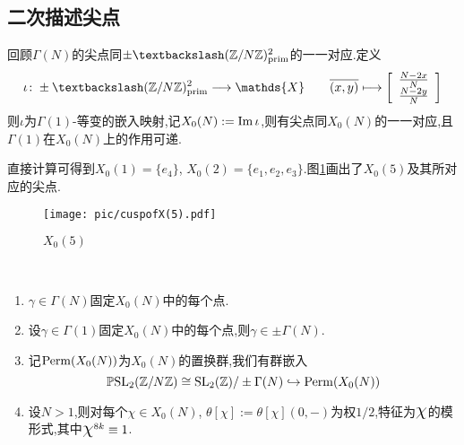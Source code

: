 \subsection{二次描述尖点}
\begin{theorem}
	回顾$\Gamma(N)$的尖点同$\pm\textbackslash(\mathbb{Z}/N\mathbb{Z})^2_{\prim}$的一一对应.定义
	$$\iota\colon \pm\textbackslash(\mathbb{Z}/N\mathbb{Z})^2_{\prim} \longrightarrow \mathds{X} \qquad \overline{(x,y)} \longmapsto \character{\frac{N-2x}{N}}{\frac{N-2y}{N}}$$
	则$\iota$为$\Gamma(1)$-等变的嵌入映射,记$X_0(N):=\operatorname{\operatorname{Im}} \iota$,则有尖点同$X_0(N)$的一一对应,且$\Gamma(1)$在$X_0(N)$上的作用可递.
\end{theorem}
\begin{example1}
	直接计算可得到$X_0(1)=\{e_4\}$, $X_0(2)=\{e_1,e_2,e_3\}$.图\ref{pic:cusps}画出了$X_0(5)$及其所对应的尖点.
	
	\begin{figure}[ht]
		\centering
		\texttt{[image: pic/cuspofX(5).pdf]}
		\caption{$X_0(5)$}
		\label{pic:cusps}
	\end{figure}
\end{example1}
\begin{theorem}\
	\begin{enumerate}[1.]
		\item $\gamma \in \Gamma(N)$固定$X_0(N)$中的每个点.
		\item 设$\gamma \in \Gamma(1)$固定$X_0(N)$中的每个点,则$\gamma \in \pm\Gamma(N)$.
		\item 记$\operatorname{\operatorname{Perm}}(X_0(N))$为$X_0(N)$的置换群,我们有群嵌入
		$$\operatorname{\mathbb{P}SL}_2(\mathbb{Z}/N\mathbb{Z}) \cong \operatorname{SL}_2(\mathbb{Z})/\pm\Gamma(N) \hookrightarrow \operatorname{\operatorname{Perm}}(X_0(N))$$
		\item 设$N>1$,则对每个$\chi \in X_0(N)$, $\theta[\chi]:=\theta[\chi](0,-)$为权$1/2$,特征为$\mbox{\Large$\chi$}$的模形式,其中$\mbox{\Large$\chi$}^{8k} \equiv 1 $.
	\end{enumerate}
	
\end{theorem}
